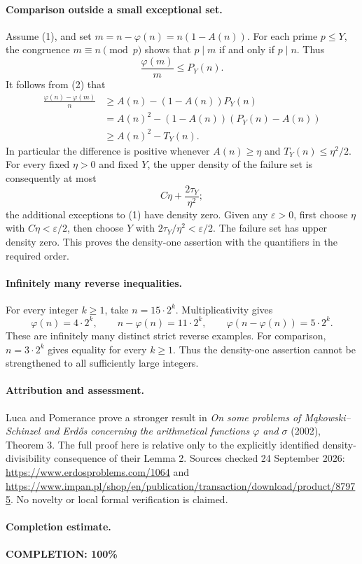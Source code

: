 \paragraph{Comparison outside a small exceptional set.}
Assume (1), and set \(m=n-\varphi(n)=n(1-A(n))\).
For each prime \(p\leq Y\), the congruence \(m\equiv n\pmod p\) shows that \(p\mid m\) if and only if \(p\mid n\). Thus
\[
 \frac{\varphi(m)}m\leq P_Y(n).
\]
It follows from (2) that
\[
\begin{split}
 \frac{\varphi(n)-\varphi(m)}n
 &\geq A(n)-(1-A(n))P_Y(n)\\
 &=A(n)^2-(1-A(n))(P_Y(n)-A(n))\\
 &\geq A(n)^2-T_Y(n).
\end{split}
 \tag{5}
\]
In particular the difference is positive whenever \(A(n)\geq\eta\) and \(T_Y(n)\leq\eta^2/2\).
For every fixed \(\eta>0\) and fixed \(Y\), the upper density of the failure set is consequently at most
\[
 C\eta+\frac{2\tau_Y}{\eta^2};
\]
the additional exceptions to (1) have density zero. Given any \(\varepsilon>0\), first choose \(\eta\) with \(C\eta<\varepsilon/2\), then choose \(Y\) with \(2\tau_Y/\eta^2<\varepsilon/2\). The failure set has upper density zero. This proves the density-one assertion with the quantifiers in the required order.

\paragraph{Infinitely many reverse inequalities.}
For every integer \(k\geq1\), take \(n=15\cdot2^k\). Multiplicativity gives
\[
 \varphi(n)=4\cdot2^k,\qquad
 n-\varphi(n)=11\cdot2^k,\qquad
 \varphi(n-\varphi(n))=5\cdot2^k.
\]
These are infinitely many distinct strict reverse examples. For comparison, \(n=3\cdot2^k\) gives equality for every \(k\geq1\). Thus the density-one assertion cannot be strengthened to all sufficiently large integers.

\paragraph{Attribution and assessment.}
Luca and Pomerance prove a stronger result in \emph{On some problems of M\k{a}kowski--Schinzel and Erd\H{o}s concerning the arithmetical functions \(\varphi\) and \(\sigma\)} (2002), Theorem 3. The full proof here is relative only to the explicitly identified density-divisibility consequence of their Lemma 2. Sources checked 24 September 2026: \url{https://www.erdosproblems.com/1064} and \url{https://www.impan.pl/shop/en/publication/transaction/download/product/87975}. No novelty or local formal verification is claimed.

\paragraph{Completion estimate.}
\textbf{COMPLETION: 100\%}
